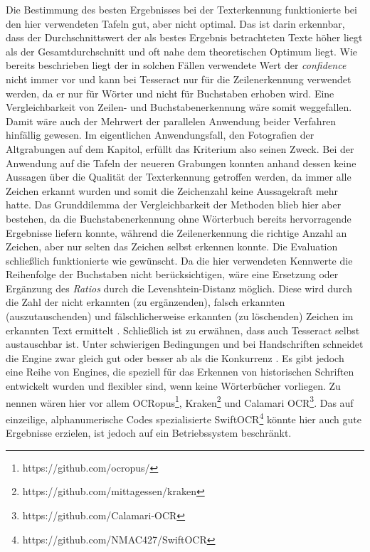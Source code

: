 Die Bestimmung des besten Ergebnisses bei der Texterkennung funktionierte bei den hier verwendeten Tafeln gut, aber nicht optimal. Das ist darin erkennbar, dass der Durchschnittswert der als bestes Ergebnis betrachteten Texte höher liegt als der Gesamtdurchschnitt und oft nahe dem theoretischen Optimum liegt. Wie bereits beschrieben liegt der in solchen Fällen verwendete Wert der \textit{confidence} nicht immer vor und kann bei Tesseract nur für die Zeilenerkennung verwendet werden, da er nur für Wörter und nicht für Buchstaben erhoben wird. Eine Vergleichbarkeit von Zeilen- und Buchstabenerkennung wäre somit weggefallen. Damit wäre auch der Mehrwert der parallelen Anwendung beider Verfahren hinfällig gewesen. Im eigentlichen Anwendungsfall, den Fotografien der Altgrabungen auf dem Kapitol, erfüllt das Kriterium also seinen Zweck. Bei der Anwendung auf die Tafeln der neueren Grabungen konnten anhand dessen keine Aussagen über die Qualität der Texterkennung getroffen werden, da immer alle Zeichen erkannt wurden und somit die Zeichenzahl keine Aussagekraft mehr hatte. Das Grunddilemma der Vergleichbarkeit der Methoden blieb hier aber bestehen, da die Buchstabenerkennung ohne Wörterbuch bereits hervorragende Ergebnisse liefern konnte, während die Zeilenerkennung die richtige Anzahl an Zeichen, aber nur selten das Zeichen selbst erkennen konnte.
Die Evaluation schließlich funktionierte wie gewünscht. Da die hier verwendeten Kennwerte die Reihenfolge der Buchstaben nicht berücksichtigen, wäre eine Ersetzung oder Ergänzung des \textit{Ratios} durch die Levenshtein-Distanz möglich. Diese wird durch die Zahl der nicht erkannten (zu ergänzenden), falsch erkannten (auszutauschenden) und fälschlicherweise erkannten (zu löschenden) Zeichen im erkannten Text ermittelt \cite{Levenshtein_SPD66}.
Schließlich ist zu erwähnen, dass auch Tesseract selbst austauschbar ist. Unter schwierigen Bedingungen und bei Handschriften schneidet die Engine zwar gleich gut oder besser ab als die Konkurrenz \cite{forsberg}. Es gibt jedoch eine Reihe von Engines, die speziell für das Erkennen von historischen Schriften entwickelt wurden und flexibler sind, wenn keine Wörterbücher vorliegen. Zu nennen wären hier vor allem OCRopus\footnote{https://github.com/ocropus/}, Kraken\footnote{https://github.com/mittagessen/kraken} und Calamari OCR\footnote{https://github.com/Calamari-OCR}. Das auf einzeilige, alphanumerische Codes spezialisierte SwiftOCR\footnote{https://github.com/NMAC427/SwiftOCR} könnte hier auch gute Ergebnisse erzielen, ist jedoch auf ein Betriebssystem beschränkt.
